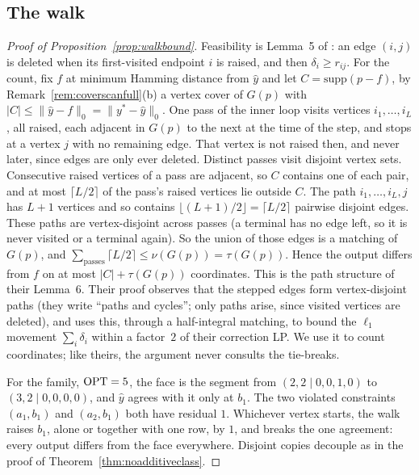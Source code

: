 \subsection{The walk}

\begin{proof}[Proof of Proposition~\ref{prop:walkbound}]
Feasibility is Lemma~5 of \citet{dinitz2021}: an edge $(i,j)$ is deleted when its first-visited endpoint $i$ is
raised, and then $\delta_i \ge r_{ij}$. For the count, fix $f$ at minimum Hamming distance from
$\hat y$ and let $C = \mathrm{supp}(p - f)$, by Remark~\ref{rem:coverscanfull}(b) a vertex cover of $G(p)$ with $|C| \le \|\hat y - f\|_0 = \|y^* - \hat y\|_0$. One pass of the inner loop visits vertices $i_1, \dots, i_L$, all
raised, each adjacent in $G(p)$ to the next at the time of the step, and stops at a vertex $j$
with no remaining edge. That vertex is not raised then, and never later, since edges are only ever
deleted. Distinct passes visit disjoint vertex sets. Consecutive raised vertices of a pass are
adjacent, so $C$ contains one of each pair, and at most $\lceil L/2 \rceil$ of the pass's raised
vertices lie outside $C$. The path $i_1, \dots, i_L, j$ has $L + 1$ vertices and so contains
$\lfloor (L+1)/2 \rfloor = \lceil L/2 \rceil$ pairwise disjoint edges. These paths are
vertex-disjoint across passes (a terminal has no edge left, so it is never visited or a terminal
again). So the union of those edges is a matching of $G(p)$, and
$\sum_{\mathrm{passes}} \lceil L/2 \rceil \le \nu(G(p)) = \tau(G(p))$. Hence the output differs
from $f$ on at most $|C| + \tau(G(p))$ coordinates. This is the path structure of their Lemma~6.
Their proof observes that the stepped edges form vertex-disjoint paths (they write ``paths and
cycles''; only paths arise, since visited vertices are deleted), and uses this, through a
half-integral matching, to bound the $\ell_1$ movement $\sum_i \delta_i$ within a factor~$2$ of
their correction LP. We use it to count coordinates; like theirs, the argument never consults the
tie-breaks.

For the family, $\mathrm{OPT} = 5$, the face is the segment from $(2, 2 \mid 0, 0, 1, 0)$ to
$(3, 2 \mid 0, 0, 0, 0)$, and $\hat y$ agrees with it only at $b_1$. The two violated constraints
$(a_1, b_1)$ and $(a_2, b_1)$ both have residual $1$. Whichever vertex starts, the walk raises
$b_1$, alone or together with one row, by $1$, and breaks the one agreement: every output
differs from the face everywhere. Disjoint copies decouple as in the proof of
Theorem~\ref{thm:noadditiveclass}.
\end{proof}

